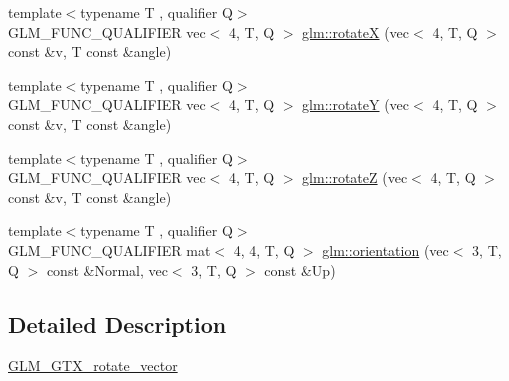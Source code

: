 \begin{DoxyCompactItemize}
\item 
{\footnotesize template$<$typename T , qualifier Q$>$ }\\G\+L\+M\+\_\+\+F\+U\+N\+C\+\_\+\+Q\+U\+A\+L\+I\+F\+I\+ER vec$<$ 4, T, Q $>$ \hyperlink{group__gtx__rotate__vector_ga4333b1ea8ebf1bd52bc3801a7617398a}{glm\+::rotateX} (vec$<$ 4, T, Q $>$ const \&v, T const \&angle)
\item 
{\footnotesize template$<$typename T , qualifier Q$>$ }\\G\+L\+M\+\_\+\+F\+U\+N\+C\+\_\+\+Q\+U\+A\+L\+I\+F\+I\+ER vec$<$ 4, T, Q $>$ \hyperlink{group__gtx__rotate__vector_ga3ce3db0867b7f8efd878ee34f95a623b}{glm\+::rotateY} (vec$<$ 4, T, Q $>$ const \&v, T const \&angle)
\item 
{\footnotesize template$<$typename T , qualifier Q$>$ }\\G\+L\+M\+\_\+\+F\+U\+N\+C\+\_\+\+Q\+U\+A\+L\+I\+F\+I\+ER vec$<$ 4, T, Q $>$ \hyperlink{group__gtx__rotate__vector_ga923b75c6448161053768822d880702e6}{glm\+::rotateZ} (vec$<$ 4, T, Q $>$ const \&v, T const \&angle)
\item 
{\footnotesize template$<$typename T , qualifier Q$>$ }\\G\+L\+M\+\_\+\+F\+U\+N\+C\+\_\+\+Q\+U\+A\+L\+I\+F\+I\+ER mat$<$ 4, 4, T, Q $>$ \hyperlink{group__gtx__rotate__vector_ga1a32fceb71962e6160e8af295c91930a}{glm\+::orientation} (vec$<$ 3, T, Q $>$ const \&Normal, vec$<$ 3, T, Q $>$ const \&Up)
\end{DoxyCompactItemize}


\subsection{Detailed Description}
\hyperlink{group__gtx__rotate__vector}{G\+L\+M\+\_\+\+G\+T\+X\+\_\+rotate\+\_\+vector} 